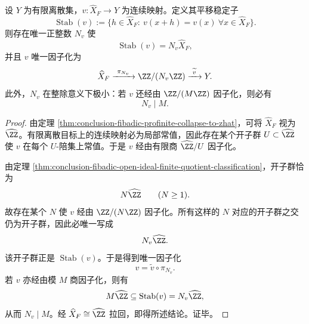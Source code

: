 \begin{theorem}[有限值连续观测的算术导体]\label{thm:conclusion-fibadic-finite-valued-observable-conductor}
设 \(Y\) 为有限离散集，\(v:\widehat X_F\to Y\) 为连续映射。定义其平移稳定子
\[
\operatorname{Stab}(v)
:=
\{h\in \widehat X_F:\ v(x+h)=v(x)\ \forall x\in \widehat X_F\}.
\]
则存在唯一正整数 \(N_v\) 使
\[
\operatorname{Stab}(v)=N_v\widehat X_F,
\]
并且 \(v\) 唯一因子化为
\[
\widehat X_F\xrightarrow{\ \pi_{N_v}\ } \ZZ/(N_v\ZZ)\xrightarrow{\ \widetilde v\ } Y.
\]
此外，\(N_v\) 在整除意义下极小：若 \(v\) 还经由 \(\ZZ/(M\ZZ)\) 因子化，则必有
\[
N_v\mid M.
\]
\end{theorem}
\begin{proof}
由定理 \ref{thm:conclusion-fibadic-profinite-collapse-to-zhat}，可将 \(\widehat X_F\) 视为 \(\widehat{\ZZ}\)。有限离散目标上的连续映射必为局部常值，因此存在某个开子群 \(U\subset \widehat{\ZZ}\) 使 \(v\) 在每个 \(U\)-陪集上常值。于是 \(v\) 经由有限商 \(\widehat{\ZZ}/U\) 因子化。

由定理 \ref{thm:conclusion-fibadic-open-ideal-finite-quotient-classification}，开子群恰为
\[
N\widehat{\ZZ}\qquad (N\ge 1).
\]
故存在某个 \(N\) 使 \(v\) 经由 \(\ZZ/(N\ZZ)\) 因子化。所有这样的 \(N\) 对应的开子群之交仍为开子群，因此必唯一写成
\[
N_v\widehat{\ZZ}.
\]
该开子群正是 \(\operatorname{Stab}(v)\)。于是得到唯一因子化
\[
v=\widetilde v\circ \pi_{N_v}.
\]
若 \(v\) 亦经由模 \(M\) 商因子化，则有
\[
M\widehat{\ZZ}\subseteq \operatorname{Stab}(v)=N_v\widehat{\ZZ},
\]
从而 \(N_v\mid M\)。经 \(\widehat X_F\cong \widehat{\ZZ}\) 拉回，即得所述结论。证毕。
\end{proof}

